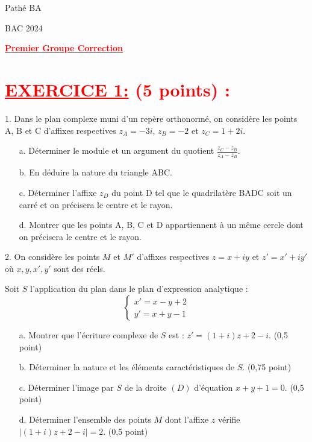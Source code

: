 \documentclass[12pt]{article}
\begin{document}
\begin{minipage}{0.8\textwidth}
	Pathé BA                          
\end{minipage}
\begin{minipage}{0.8\textwidth}
	BAC 2024
\end{minipage}

\begin{center}
\textbf{{\underline{\textcolor{red}{Premier Groupe Correction}}}}
\end{center}
\section*{\textcolor{red}{\underline{EXERCICE 1:} (5 points) :}}

1. Dans le plan complexe muni d'un repère orthonormé, on considère les points A, B et C d'affixes respectives \(z_A = -3i\), \(z_B = -2\) et \(z_C = 1+2i\).

\begin{enumerate}
    \item[a.] Déterminer le module et un argument du quotient \(\frac{z_C - z_B}{z_A - z_B}\).
    \item[b.] En déduire la nature du triangle ABC.
    \item[c.] Déterminer l'affixe \(z_D\) du point D tel que le quadrilatère BADC soit un carré et on précisera le centre et le rayon.
    \item[d.] Montrer que les points A, B, C et D appartiennent à un même cercle dont on précisera le centre et le rayon.
\end{enumerate}

2. On considère les points \(M\) et \(M'\) d'affixes respectives \(z = x + iy\) et \(z' = x' + iy'\) où \(x, y, x', y'\) sont des réels.

Soit \(S\) l'application du plan dans le plan d'expression analytique :
\[
\begin{cases}
    x' = x - y + 2 \\
    y' = x + y - 1
\end{cases}
\]

\begin{enumerate}
    \item[a.] Montrer que l'écriture complexe de \(S\) est : \(z' = (1 + i)z + 2 - i\). (0,5 point)
    \item[b.] Déterminer la nature et les éléments caractéristiques de \(S\). (0,75 point)
    \item[c.] Déterminer l'image par \(S\) de la droite \((D)\) d'équation \(x + y + 1 = 0\). (0,5 point)
    \item[d.] Déterminer l'ensemble des points \(M\) dont l'affixe \(z\) vérifie \(\mid(1 + i)z + 2 - i \mid= 2\). (0,5 point)
\end{enumerate}
\end{document}
